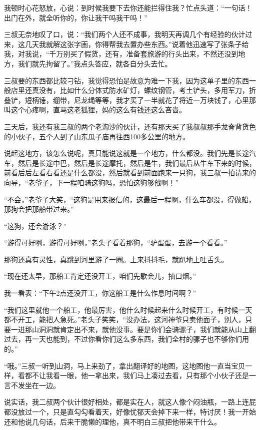 我顿时心花怒放，心说：到时候我要下去你还能拦得住我？忙点头道：“一句话！出门在外，就全听你的，你让我干吗我干吗！”

三叔无奈地叹了口，说：“我们两个人还不成事，我明天再调几个有经验的伙计过来，这几天我就解这张字画，你得帮我去置办些东西。”说着他迅速写了张条子给我，对我说，“千万别买了假货，还有，准备套旅游的行头出来，不然还没到地方，我们就先拘留了。”我点头答应，就各自分头去忙。

三叔要的东西都比较刁钻，我觉得恐怕是故意为难一下我，因为这单子里的东西一般店里还真没有，比如什么分体式防水矿灯，螺纹钢管，考土铲头，多用军刀，折叠铲，短柄锤，绷带，尼龙绳等等，我才买了一半就花了将近一万块钱了，心里那叫这个心疼啊，直骂这老狐狸，妈的这么有钱还这么吝啬。

三天后，我还有我三叔的两个老淘沙的伙计，还有那天买了我叔叔那手龙脊背货色的小伙子，五个人到了山东瓜子庙再往西100多公里的地方。

说起这地方，该怎么说呢，真只能说这就是一个地方，什么都没。我们先是长途汽车，然后是长途中巴，然后是长途摩托，然后是牛，我们最后从牛车下来的时候，前看后后左看右看还是什么都没，然后就看到前面跑来一只狗，我三叔一拍请来的向导，“老爷子，下一程咱骑这狗吗，恐怕这狗够戗啊！”

“不会，”老爷子大笑，“这狗是用来报信的，这最后一程啊，什么车都没，得做船，那狗会把那船带过来。”

“这狗，还会游泳？”

“游得可好咧，游得可好咧，”老头子看着那狗，“驴蛋蛋，去游一个看看。”

那狗还真有灵性，真跳到河里游了一圈。上来抖抖毛，就趴地上吐舌头。

“现在还太早，那船工肯定还没开工，咱们先歇会儿，抽口烟。”

我一看表：“下午2点还没开工，你这船工是什么作息时间啊？”

“我们这里就他一个船工，他最厉害，他什么时候起来什么时候开工，有时候一天都不开工，能把人急死。”老头子笑笑，“没办法，这河神爷只卖他面子，别人，只要一进那山洞洞就肯定出不来，就他没事。要是你们会骑骡子，我们就能从山上翻过去，再一天也能到，不过你看你们这么多东西，我们全村的骡子也不够你们用的。”

“哦。”三叔一听到山洞，马上来劲了，拿出翻译好的地图，这地图他一直当宝贝一样，看都不让我看一眼，他一拿出来，我们马上凑过去看，只有那个小伙子还是一言不发坐在一边。

说实话，我二叔两个伙计很好相处，都是实在人，就这人像个闷油瓶，一路上连屁都没放过一个，只是直勾勾看着天，好像忧郁天会掉下来一样，特讨厌！我一开始还和他说几句话，后来干脆懒的理他，真不明白三叔把他带来干什么。

